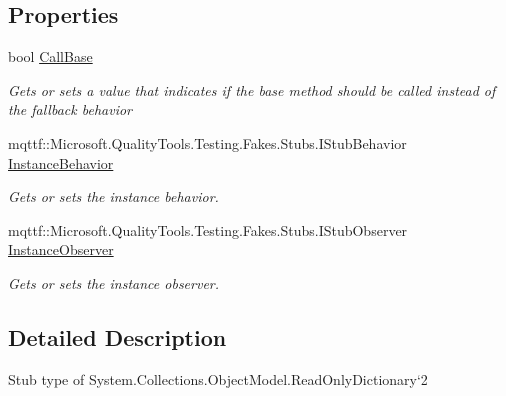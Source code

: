 \subsection*{Properties}
\begin{DoxyCompactItemize}
\item 
bool \hyperlink{class_system_1_1_collections_1_1_object_model_1_1_fakes_1_1_stub_read_only_dictionary_3_01_t_key_00_01_t_value_01_4_a8bee6e0fdba5fcf35c0adc326f4b99c1}{Call\-Base}
\begin{DoxyCompactList}\small\item\em Gets or sets a value that indicates if the base method should be called instead of the fallback behavior\end{DoxyCompactList}\item 
mqttf\-::\-Microsoft.\-Quality\-Tools.\-Testing.\-Fakes.\-Stubs.\-I\-Stub\-Behavior \hyperlink{class_system_1_1_collections_1_1_object_model_1_1_fakes_1_1_stub_read_only_dictionary_3_01_t_key_00_01_t_value_01_4_a42a772ce9a3033539108ca85de52dd62}{Instance\-Behavior}
\begin{DoxyCompactList}\small\item\em Gets or sets the instance behavior.\end{DoxyCompactList}\item 
mqttf\-::\-Microsoft.\-Quality\-Tools.\-Testing.\-Fakes.\-Stubs.\-I\-Stub\-Observer \hyperlink{class_system_1_1_collections_1_1_object_model_1_1_fakes_1_1_stub_read_only_dictionary_3_01_t_key_00_01_t_value_01_4_a2a37502b848e988362aa625b28e70801}{Instance\-Observer}
\begin{DoxyCompactList}\small\item\em Gets or sets the instance observer.\end{DoxyCompactList}\end{DoxyCompactItemize}


\subsection{Detailed Description}
Stub type of System.\-Collections.\-Object\-Model.\-Read\-Only\-Dictionary`2



